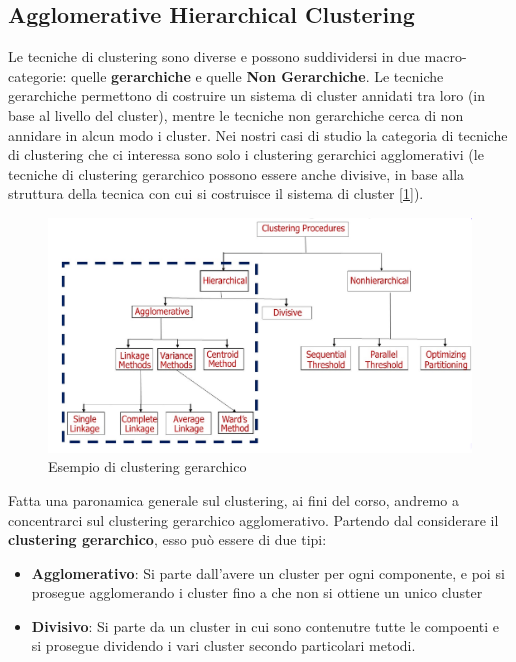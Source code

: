 \subsection{Agglomerative Hierarchical Clustering}
Le tecniche di clustering sono diverse e possono suddividersi in due macro-categorie: quelle \textbf{gerarchiche} e quelle \textbf{Non Gerarchiche}. Le tecniche gerarchiche permettono di costruire un sistema di cluster annidati tra loro (in base al livello del cluster), mentre le tecniche  non gerarchiche cerca di non annidare in alcun modo i cluster. Nei nostri casi di studio la categoria di tecniche di clustering che ci interessa sono solo i clustering gerarchici agglomerativi (le tecniche di clustering gerarchico possono essere anche divisive, in base alla struttura della tecnica con cui si costruisce il sistema di cluster [\ref{img:clustering-graph}]).

\begin{figure}[h]
\centering
\includegraphics[width=.8\textwidth]{img/chapter-3/clustering-graph.png}
\caption{Esempio di clustering gerarchico}\label{img:clustering-graph}
\end{figure}

Fatta una paronamica generale sul clustering, ai fini del corso, andremo a concentrarci sul clustering gerarchico agglomerativo. Partendo dal considerare il \textbf{clustering gerarchico}, esso può essere di due tipi:
\begin{itemize}
    \item \textbf{Agglomerativo}: Si parte dall'avere un cluster per ogni componente, e poi si prosegue agglomerando i cluster fino a che non si ottiene un unico cluster
    \item \textbf{Divisivo}: Si parte da un cluster in cui sono contenutre tutte le compoenti e si prosegue dividendo i vari cluster secondo particolari metodi.
\end{itemize}

